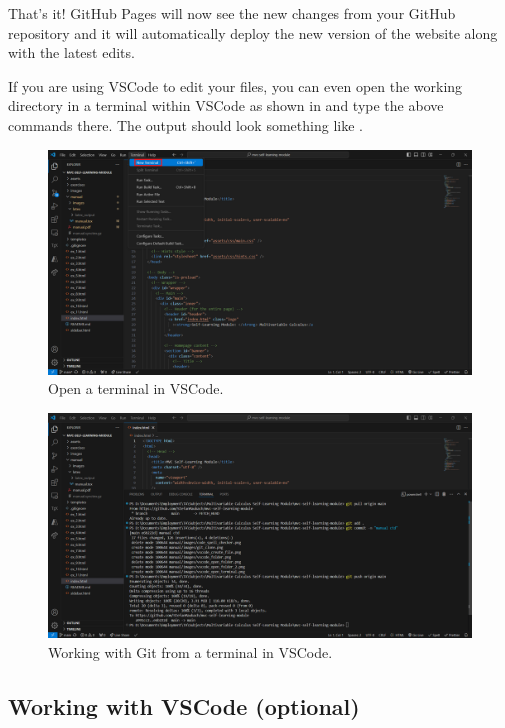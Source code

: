 \documentclass[a4paper,10pt]{article}
\begin{document}
That's it! GitHub Pages will now see the new changes from your GitHub repository and it will automatically deploy the new version of the website along with the latest edits. 

If you are using VSCode to edit your files, you can even open the working directory in a terminal within VSCode as shown in  and type the above commands there. The output should look something like .

\begin{figure}[htbp]
    \centering
    \includegraphics[width=\textwidth]{vscode_open_terminal.png}
    \caption{Open a terminal in VSCode.}
    \label{fig:vscode_open_terminal}   
\end{figure}

\begin{figure}[htbp]
    \centering
    \includegraphics[width=\textwidth]{usage.png}
    \caption{Working with Git from a terminal in VSCode.}
    \label{fig:usage}   
\end{figure}


\subsection{Working with VSCode (optional)}
\end{document}
